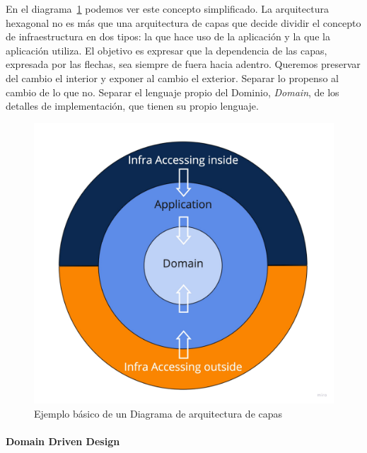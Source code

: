 En el diagrama~\cref{fig:layers} podemos ver este concepto simplificado.
La arquitectura hexagonal no es más que una arquitectura de capas que decide dividir el concepto de infraestructura en dos tipos: la que hace uso de la aplicación y la que la aplicación utiliza.
El objetivo es expresar que la dependencia de las capas, expresada por las flechas, sea siempre de fuera hacia adentro.
Queremos preservar del cambio el interior y exponer al cambio el exterior.
Separar lo propenso al cambio de lo que no.
Separar el lenguaje propio del Dominio, \textit{Domain}, de los detalles de implementación, que tienen su propio lenguaje.

\begin{figure}[H]
    \centering
    \includegraphics[height=0.22\textheight]{./part/Proyecto_ejecutivo/memoria_descriptiva/infoPreviaAntecedentes/img/PFM - Layer}
    \caption{Ejemplo básico de un Diagrama de arquitectura de capas}\label{fig:layers}
\end{figure}

\paragraph{Domain Driven Design}

